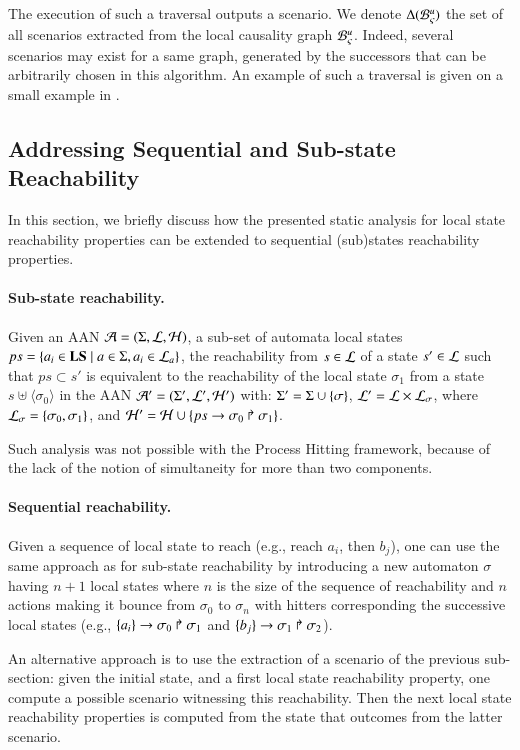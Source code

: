 The execution of such a traversal outputs a scenario.
We denote $\Delta({\mathcal{B}_{\varsigma}^{u}})$ the set of all scenarios extracted from the
local causality graph ${\mathcal{B}_{\varsigma}^{u}}$.
Indeed, several scenarios may exist for a same graph,
generated by the successors that can be arbitrarily chosen
in this algorithm.
An example of such a traversal is given on a small example
in .



\subsection{Addressing Sequential and Sub-state Reachability}
\label{ssec:ordered-ua}
\label{ssec:simult-ua}

\newcommand{\total}{\tau}
\newcommand{\reach}{\sigma}

In this section, we briefly discuss how the presented static analysis for local
state reachability properties can be extended to sequential (sub)states
reachability properties.

\paragraph{Sub-state reachability.}
Given an AAN $\mathcal{A} = (\Sigma, \mathcal{L}, \mathcal{H})$,
a sub-set of automata local states
$ps = \{ a_i \in\mathbf{LS}\mid a\in\Sigma, a_i\in\mathcal{L}_a\}$,
the reachability from $s\in\mathcal{L}$ of a state $s'\in\mathcal{L}$ such that
$ps\subset s'$ is equivalent to the reachability of the local state
$\reach_1$ from a state $s\uplus\langle\reach_0\rangle$
in the AAN
$\mathcal{A}' = (\Sigma', \mathcal{L}', \mathcal{H}')$ with:
$\PHs' = \PHs \cup \{ \reach \}$, $\PHl' = \PHl \times \PHl_\reach$,
where $\PHl_\reach = \{ \reach_0, \reach_1 \}$,
and $\PHh' = \PHh \cup \{ \PHhit{ps}{\reach_0}{\reach_1} \}$.

Such analysis was not possible with the Process Hitting framework,
because of the lack of the notion of simultaneity for more than two components.


\paragraph{Sequential reachability.}
Given a sequence of local state to reach (e.g., reach $a_i$, then $b_j$),
one can use the same approach as for sub-state reachability by introducing
a new automaton $\reach$ having $n+1$ local states where $n$ is the size of the
sequence of reachability and $n$ actions making it bounce from $\reach_0$ to
$\reach_n$ with hitters corresponding the successive local states
(e.g., $\PHfrappes{a_i}{\reach_0}{\reach_1}$ and
$\PHfrappes{b_j}{\reach_1}{\reach_2}$).

An alternative approach is to use the extraction of a scenario of the previous
sub-section:
given the initial state, and a first local state reachability property, one
compute a possible scenario witnessing this reachability.
Then the next local state reachability properties is computed from the
state that outcomes from the latter scenario.


